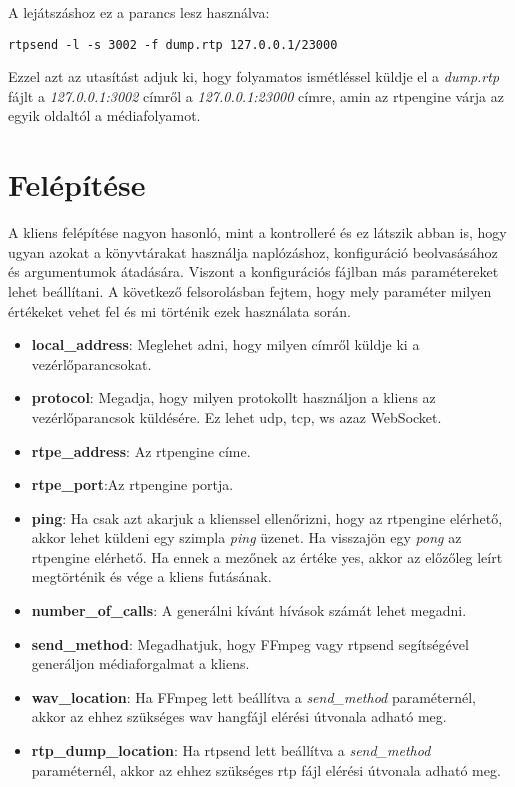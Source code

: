 A lejátszáshoz ez a parancs lesz használva: 

\begin{lstlisting}[caption=RTP folyam generálásda rtpsend segítségével, label=lst:rtpsend]
rtpsend -l -s 3002 -f dump.rtp 127.0.0.1/23000
\end{lstlisting}

Ezzel azt az utasítást adjuk ki, hogy folyamatos ismétléssel küldje el a 
\textit{dump.rtp} fájlt a \textit{127.0.0.1:3002} címről a \textit{127.0.0.1:23000}
címre, amin az rtpengine várja az egyik oldaltól a médiafolyamot.

\section{Felépítése}

A kliens felépítése nagyon hasonló, mint a kontrolleré és ez látszik abban is, hogy
ugyan azokat a könyvtárakat használja naplózáshoz, konfiguráció beolvasásához és
argumentumok átadására. Viszont a konfigurációs fájlban más paramétereket lehet 
beállítani. A következő felsorolásban fejtem, hogy mely paraméter milyen értékeket 
vehet fel és mi történik ezek használata során. 

\begin{itemize}
	\item \textbf{local\_address}: Meglehet adni, hogy milyen címről küldje
	ki a vezérlőparancsokat.
	\item \textbf{protocol}: Megadja, hogy milyen protokollt használjon a kliens az
	vezérlőparancsok küldésére. Ez lehet udp, tcp, ws azaz WebSocket.
	\item \textbf{rtpe\_address}: Az rtpengine címe. 
	\item \textbf{rtpe\_port}:Az rtpengine portja.
	\item \textbf{ping}: Ha csak azt akarjuk a klienssel ellenőrizni, hogy az rtpengine
	elérhető, akkor lehet küldeni egy szimpla \textit{ping} üzenet. Ha visszajön egy
	\textit{pong} az rtpengine elérhető. Ha ennek a mezőnek az értéke yes, akkor 
	az előzőleg leírt megtörténik és vége a kliens futásának. 
	\item \textbf{number\_of\_calls}: A generálni kívánt hívások számát lehet megadni. 
	\item \textbf{send\_method}: Megadhatjuk, hogy FFmpeg vagy rtpsend segítségével
	generáljon médiaforgalmat a kliens.
	\item \textbf{wav\_location}: Ha FFmpeg lett beállítva a \textit{send\_method} 
	paraméternél, akkor az ehhez szükséges wav hangfájl elérési útvonala adható meg.
	\item \textbf{rtp\_dump\_location}: Ha rtpsend lett beállítva a 
	\textit{send\_method} paraméternél, akkor az ehhez szükséges rtp fájl elérési 
	útvonala adható meg.
\end{itemize}

